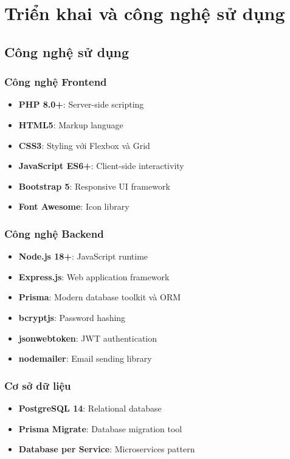 \documentclass[12pt,a4paper]{report}
\begin{document}
\chapter{Triển khai và công nghệ sử dụng}

\section{Công nghệ sử dụng}

\subsection{Công nghệ Frontend}
\begin{itemize}
    \item \textbf{PHP 8.0+}: Server-side scripting
    \item \textbf{HTML5}: Markup language
    \item \textbf{CSS3}: Styling với Flexbox và Grid
    \item \textbf{JavaScript ES6+}: Client-side interactivity
    \item \textbf{Bootstrap 5}: Responsive UI framework
    \item \textbf{Font Awesome}: Icon library
\end{itemize}

\subsection{Công nghệ Backend}
\begin{itemize}
    \item \textbf{Node.js 18+}: JavaScript runtime
    \item \textbf{Express.js}: Web application framework
    \item \textbf{Prisma}: Modern database toolkit và ORM
    \item \textbf{bcryptjs}: Password hashing
    \item \textbf{jsonwebtoken}: JWT authentication
    \item \textbf{nodemailer}: Email sending library
\end{itemize}

\subsection{Cơ sở dữ liệu}
\begin{itemize}
    \item \textbf{PostgreSQL 14}: Relational database
    \item \textbf{Prisma Migrate}: Database migration tool
    \item \textbf{Database per Service}: Microservices pattern
\end{itemize}
\end{document}
